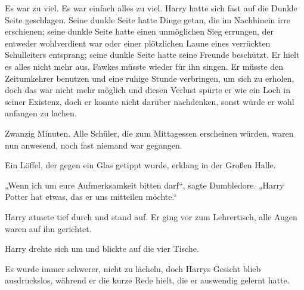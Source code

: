 Es war zu viel. Es war einfach alles zu viel. Harry hatte sich fast auf die Dunkle Seite geschlagen. Seine dunkle Seite hatte Dinge getan, die im Nachhinein irre erschienen; seine dunkle Seite hatte einen unmöglichen Sieg errungen, der entweder wohlverdient war oder einer plötzlichen Laune eines verrückten Schulleiters entsprang; seine dunkle Seite hatte seine Freunde beschützt. Er hielt es alles nicht mehr aus. Fawkes müsste wieder für ihn singen. Er müsste den Zeitumkehrer benutzen und eine ruhige Stunde verbringen, um sich zu erholen, doch das war nicht mehr möglich und diesen Verlust spürte er wie ein Loch in seiner Existenz, doch er konnte nicht darüber nachdenken, sonst würde er wohl anfangen zu lachen.

Zwanzig Minuten. Alle Schüler, die zum Mittagessen erscheinen würden, waren nun anwesend, noch fast niemand war gegangen.

Ein Löffel, der gegen ein Glas getippt wurde, erklang in der Großen Halle.

„Wenn ich um eure Aufmerksamkeit bitten darf“, sagte Dumbledore.
„Harry Potter hat etwas, das er uns mitteilen möchte.“

Harry atmete tief durch und stand auf. Er ging vor zum Lehrertisch, alle Augen waren auf ihn gerichtet.

Harry drehte sich um und blickte auf die vier Tische.

Es wurde immer schwerer, nicht zu lächeln, doch Harrys Gesicht blieb ausdruckslos, während er die kurze Rede hielt, die er auswendig gelernt hatte.

